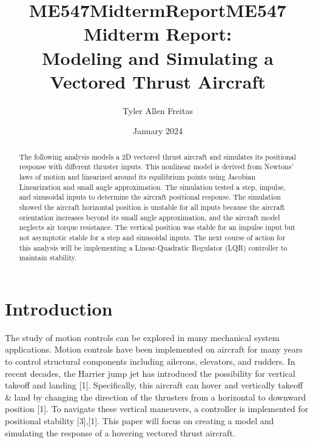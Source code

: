 \documentclass[conference]{IEEEtran}
\begin{document}
\title{ME547MidtermReport}
\author{Tyler Allen Freitas}
\date{January 2024}

\title{ME547 Midterm Report: \\ Modeling and Simulating a Vectored Thrust Aircraft}

\author{
}

\maketitle

\begin{abstract}
The following analysis models a 2D vectored thrust aircraft and simulates its positional response with different thruster inputs. This nonlinear model is derived from Newtons' laws of motion and linearized around its equilibrium points using Jacobian Linearization and small angle approximation. The simulation tested a step, impulse, and sinusoidal inputs to determine the aircraft positional response. The simulation showed the aircraft horizontal position is unstable for all inputs because the aircraft orientation increases beyond its small angle approximation, and the aircraft model neglects air torque resistance. The vertical position was stable for an impulse input but not asymptotic stable for a step and sinusoidal inputs. The next course of action for this analysis will be implementing a Linear-Quadratic Regulator (LQR) controller to maintain stability.
\end{abstract}


\section{Introduction}
The study of motion controls can be explored in many mechanical system applications. Motion controls have been implemented on aircraft for many years to control structural components including ailerons, elevators, and rudders. In recent decades, the Harrier jump jet has introduced the possibility for vertical takeoff and landing [1]. Specifically, this aircraft can hover and vertically takeoff \& land by changing the direction of the thrusters from a horizontal to downward position [1]. To navigate these vertical maneuvers, a controller is implemented for positional stability [3],[1]. This paper will focus on creating a model and simulating the response of a hovering vectored thrust aircraft.  
\end{document}
